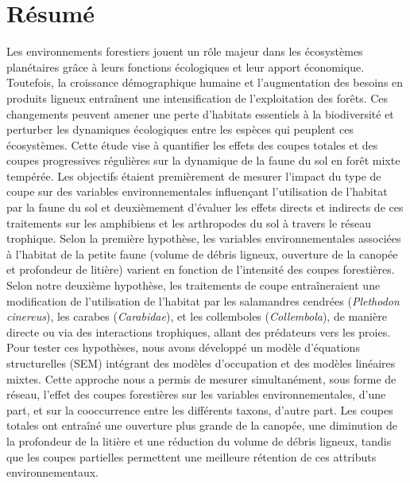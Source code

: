 \chapter*{Résumé}               %
\label{chap-resume}             %

Les environnements forestiers jouent un rôle majeur dans les écosystèmes planétaires grâce à leurs fonctions écologiques et leur apport économique. 
Toutefois, la croissance démographique humaine et l’augmentation des besoins en produits ligneux entraînent une intensification de l'exploitation des forêts. 
Ces changements peuvent amener une perte d'habitats essentiels à la biodiversité et perturber les dynamiques écologiques entre les espèces qui peuplent ces écosystèmes. 
Cette étude vise à quantifier les effets des coupes totales et des coupes progressives régulières sur la dynamique de la faune du sol en forêt mixte tempérée. 
Les objectifs étaient premièrement de mesurer l’impact du type de coupe sur des variables environnementales influençant l’utilisation de l’habitat par la faune du sol 
et deuxièmement d’évaluer les effets directs et indirects de ces traitements sur les amphibiens et les arthropodes du sol à travers le réseau trophique. 
Selon la première hypothèse, les variables environnementales associées à l’habitat de la petite faune (volume de débris ligneux, ouverture de la canopée et profondeur de litière) varient en fonction de l’intensité des coupes forestières. 
Selon notre deuxième hypothèse, les traitements de coupe entraîneraient une modification de l'utilisation de l'habitat 
par les salamandres cendrées (\textit{Plethodon cinereus}), les carabes (\textit{Carabidae}), et les collemboles (\textit{Collembola}), de manière directe ou via des interactions trophiques, 
allant des prédateurs vers les proies. 
Pour tester ces hypothèses, nous avons développé un modèle d’équations structurelles (SEM) intégrant des modèles d’occupation et des modèles linéaires mixtes. 
Cette approche nous a permis de mesurer simultanément, sous forme de réseau, l’effet des coupes forestières sur les variables environnementales, d’une part, et sur la cooccurrence entre les différents taxons, d’autre part. 
Les coupes totales ont entraîné une ouverture plus grande de la canopée, une diminution de la profondeur de la litière et une réduction du volume de débris ligneux, 
tandis que les coupes partielles permettent une meilleure rétention de ces attributs environnementaux. 

